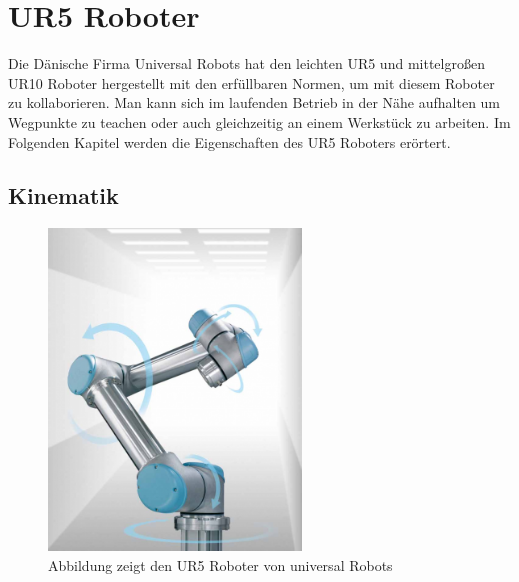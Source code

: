 \section{UR5 Roboter}
\label{sec:ur_robot_gru}

Die Dänische Firma Universal Robots hat den leichten UR5 und mittelgroßen UR10 Roboter hergestellt mit den erfüllbaren Normen, um mit diesem Roboter zu kollaborieren. Man kann sich im laufenden Betrieb in der Nähe aufhalten um Wegpunkte zu \ac{teachen} oder auch gleichzeitig an einem Werkstück zu arbeiten.
Im Folgenden Kapitel werden die Eigenschaften des UR5 Roboters erörtert.

\subsection{Kinematik}
\label{ur_eigenschaften_gru}

\begin{figure}[H]
  \centering
    \includegraphics[width=0.6\textwidth]{pic/ur5_robot.png}
      \caption[UR5 Roboter]{Abbildung zeigt den UR5 Roboter von universal Robots}
      \label{fig:schnittstellen_schichten}
\end{figure}

